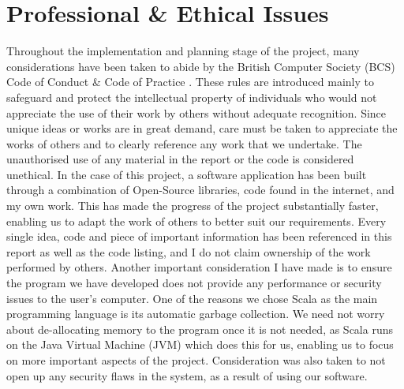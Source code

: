 \chapter{Professional \& Ethical Issues}

Throughout the implementation and planning stage of the project, many considerations have been taken to abide by the British Computer Society (BCS) Code of Conduct \& Code of Practice \cite{bcsCodeOfConduct}. These rules are introduced mainly to safeguard and protect the intellectual property of individuals who would not appreciate the use of their work by others without adequate recognition. Since unique ideas or works are in great demand, care must be taken to appreciate the works of others and to clearly reference any work that we undertake. The unauthorised use of any material in the report or the code is considered unethical. In the case of this project, a software application has been built through a combination of Open-Source libraries, code found in the internet, and my own work. This has made the progress of the project substantially faster, enabling us to adapt the work of others to better suit our requirements. Every single idea, code and piece of important information has been referenced in this report as well as the code listing, and I do not claim ownership of the work performed by others. Another important consideration I have made is to ensure the program we have developed does not provide any performance or security issues to the user's computer. One of the reasons we chose Scala as the main programming language is its automatic garbage collection. We need not worry about de-allocating memory to the program once it is not needed, as Scala runs on the Java Virtual Machine (JVM) which does this for us, enabling us to focus on more important aspects of the project. Consideration was also taken to not open up any security flaws in the system, as a result of using our software.
